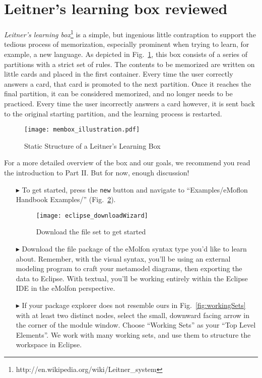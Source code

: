 \section{Leitner's learning box reviewed}

\emph{Leitner's learning box}\footnote{http://en.wikipedia.org/wiki/Leitner\_system} is a simple, but ingenious little contraption to support the tedious
process of memorization, especially prominent when trying to learn, for example, a new language. As depicted in Fig.~\ref{fig:membox_depiction}, this box
consists of a series of partitions with a strict set of rules. The contents to be memorized are written on little cards and placed in the first container. Every
time the user correctly answers a card, that card is promoted to the next partition. Once it reaches the final partition, it can be considered memorized, and
no longer needs to be practiced. Every time the user incorrectly answers a card however, it is sent back to the original starting partition, and the
learning process is restarted.

\begin{figure}[htbp]
	\centering
  \texttt{[image: membox\_illustration.pdf]}
	\caption{Static Structure of a Leitner's Learning Box}
	\label{fig:membox_depiction}
\end{figure}
\FloatBarrier

For a more detailed overview of the box and our goals, we recommend you read the introduction to Part II. But for now, enough discussion!

\begin{itemize}

\item[$\blacktriangleright$] To get started, press the \texttt{new} button and navigate to ``Examples/eMoflon Handbook Examples/''
(Fig.~\ref{fig:downloadWizard}).

\begin{figure}[htbp]
	\centering
  \texttt{[image: eclipse\_downloadWizard]}
	\caption{Download the file set to get started}
	\label{fig:downloadWizard}
\end{figure}
\FloatBarrier

\item[$\blacktriangleright$] Download the file package of the eMolfon syntax type you'd like to learn about. Remember, with the visual syntax, you'll be using
an external modeling program to craft your metamodel diagrams, then exporting the data to Eclipse. With textual, you'll be working entirely within the
Eclipse IDE in the eMolfon perspective.

\item[$\blacktriangleright$] If your package explorer does not resemble ours in Fig.~\ref{fig:workingSets} with at least two distinct nodes, select the
small, downward facing arrow in the corner of the module window. Choose ``Working Sets'' as your ``Top Level Elements''. We work with many working sets, and use
them to structure the workspace in Eclipse.
\end{itemize}

